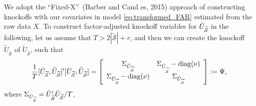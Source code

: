 ﻿\documentclass[12pt]{article}
\newcommand{\0}{\mbox{\bf 0}}
\theoremstyle{plain}%
\theoremstyle{definition}
\DeclareMathOperator{\diag}{diag}
\begin{document}
\iffalse
We adopt the \textquotedblleft Fixed-X\textquotedblright\ (Barber and Cand%
es, 2015) approach of constructing knockoffs with our covariates in
model \eqref{eq:transformed_FAR} estimated from the raw data $X$. To
construct factor-adjusted knockoff variables for $\breve{U}_{\widetilde{%
\mathcal{S}}}$ in the following, let us assume that $T>2|\widetilde{\mathcal{S}}| +r$, and then
we can create the knockoff $\widetilde{U}_{{\widetilde{\mathcal{S}}}}$ of $%
\breve{U}_{{\widetilde{\mathcal{S}}}}$, such that 
\begin{equation}
\frac{1}{T}[\breve{U}_{{\widetilde{\mathcal{S}}}},\widetilde{U}_{{\widetilde{%
\mathcal{S}}}}]^{\prime }[\breve{U}_{{\widetilde{\mathcal{S}}}},\widetilde{U}%
_{{\widetilde{\mathcal{S}}}}]=\left[ 
\begin{array}{cc}
\Sigma _{\breve{U}_{{\widetilde{\mathcal{S}}}}} & \Sigma _{\breve{U}_{_{%
\widetilde{\mathcal{S}}}}}-\diag(\nu ) \\ 
\Sigma _{\breve{U}_{{\widetilde{\mathcal{S}}}}}-\diag(\nu ) & \Sigma _{%
\breve{U}_{{\widetilde{\mathcal{S}}}}}%
\end{array}%
\right] :=\Psi ,  \label{eq:Psi}
\end{equation}%
where $\Sigma _{\breve{U}_{{\widetilde{\mathcal{S}}}}}=\breve{U}_{{%
\widetilde{\mathcal{S}}}}^{\prime}\breve{U}_{{\widetilde{\mathcal{S}}}}/T $,
\end{document}
